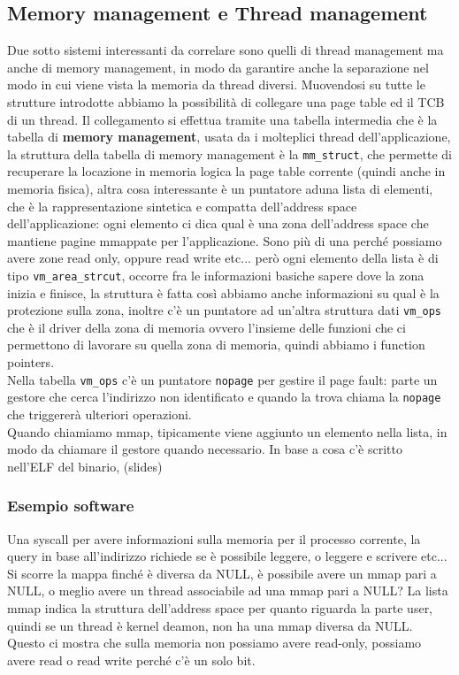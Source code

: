 \documentclass[12pt, oneside]{extbook}
\begin{document}
\subsection{Memory management e Thread management}
Due sotto sistemi interessanti da correlare sono quelli di thread management ma anche di memory management, in modo da garantire anche la separazione nel modo in cui viene vista la memoria da thread diversi. Muovendosi su tutte le strutture introdotte abbiamo la possibilità di collegare una page table ed il TCB di un thread. Il collegamento si effettua tramite una tabella intermedia che è la tabella di \textbf{memory management}, usata da i molteplici thread dell'applicazione, la struttura della tabella di memory management è la \texttt{mm\_struct}, che permette di recuperare la locazione in memoria logica la page table corrente (quindi anche in memoria fisica), altra cosa interessante è un puntatore aduna lista di elementi, che è la rappresentazione sintetica e compatta dell'address space dell'applicazione: ogni elemento ci dica qual è una zona dell'address space che mantiene pagine mmappate per l'applicazione. Sono più di una perché possiamo avere zone read only, oppure read write etc... però ogni elemento della lista è di tipo \texttt{vm\_area\_strcut}, occorre fra le informazioni basiche sapere dove la zona inizia e finisce, la struttura è fatta così
abbiamo anche informazioni su qual è la protezione sulla zona, inoltre c'è un puntatore ad un'altra struttura dati \texttt{vm\_ops} che è il driver della zona di memoria ovvero l'insieme delle funzioni che ci permettono di lavorare su quella zona di memoria, quindi abbiamo i function pointers.\\Nella tabella \texttt{vm\_ops} c'è un puntatore \texttt{nopage} per gestire il page fault: parte un gestore che cerca l'indirizzo non identificato e quando la trova chiama la \texttt{nopage} che triggererà ulteriori operazioni.\\Quando chiamiamo mmap, tipicamente viene aggiunto un elemento nella lista, in modo da chiamare il gestore quando necessario. In base a cosa c'è scritto nell'ELF del binario, (slides)
\subsubsection*{Esempio software}
Una syscall per avere informazioni sulla memoria per il processo corrente, la query in base all'indirizzo richiede se è possibile leggere, o leggere e scrivere etc...\\Si scorre la mappa finché è diversa da NULL, è possibile avere un mmap pari a NULL, o meglio avere un thread associabile ad una mmap pari a NULL? La lista mmap indica la struttura dell'address space per quanto riguarda la parte user, quindi se un thread è kernel deamon, non ha una mmap diversa da NULL. Questo ci mostra che sulla memoria non possiamo avere read-only, possiamo avere read o read write perché c'è un solo bit.
\end{document}
